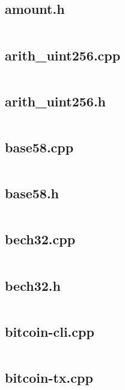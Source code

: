 \documentclass{article}
\begin{document}
\subsection{amount.h}
\inputminted{cpp}{/home/dufferzafar/dev/@clones/bitcoin/src/amount.h}
\newpage

\subsection{arith\_uint256.cpp}
\inputminted{cpp}{/home/dufferzafar/dev/@clones/bitcoin/src/arith_uint256.cpp}
\newpage

\subsection{arith\_uint256.h}
\inputminted{cpp}{/home/dufferzafar/dev/@clones/bitcoin/src/arith_uint256.h}
\newpage

\subsection{base58.cpp}
\inputminted{cpp}{/home/dufferzafar/dev/@clones/bitcoin/src/base58.cpp}
\newpage

\subsection{base58.h}
\inputminted{cpp}{/home/dufferzafar/dev/@clones/bitcoin/src/base58.h}
\newpage

\subsection{bech32.cpp}
\inputminted{cpp}{/home/dufferzafar/dev/@clones/bitcoin/src/bech32.cpp}
\newpage

\subsection{bech32.h}
\inputminted{cpp}{/home/dufferzafar/dev/@clones/bitcoin/src/bech32.h}
\newpage

\subsection{bitcoin-cli.cpp}
\inputminted{cpp}{/home/dufferzafar/dev/@clones/bitcoin/src/bitcoin-cli.cpp}
\newpage

\subsection{bitcoin-tx.cpp}
\inputminted{cpp}{/home/dufferzafar/dev/@clones/bitcoin/src/bitcoin-tx.cpp}
\newpage
\end{document}
